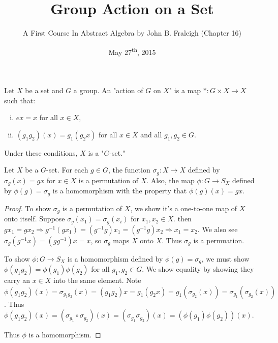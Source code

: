 \documentclass[a4paper,11pt]{article}
\title{Group Action on a Set}
\author{A First Course In Abstract Algebra by John B. Fraleigh (Chapter 16)}
\date{May 27\textsuperscript{th}, 2015}
\begin{document}
\maketitle
{}
\setlength\parindent{24pt}

\begin{outline}

    Let \(X\) be a set and \(G\) a group. An "action of \(G\) on \(X\)" is a map 
    \(*: G \times X \rightarrow X\) such that:
    \begin{enumerate}[i.]
      \item \(ex = x\) for all \(x \in X\),
      \item \((g_{1}g_{2})(x) = g_{1}(g_{2}x)\) for all \(x \in X\) and all \(g_{1}, g_{2} \in G\).
    \end{enumerate}
    Under these conditions, \(X\) is a "\(G\)-set."

    Let \(X\) be a \(G\)-set. For each \(g \in G\), the function \(\sigma_{g}: X \rightarrow X\)
    defined by \(\sigma_{g}(x) = gx\) for \(x \in X\) is a permutation of \(X\). Also, the map 
    \(\phi: G \rightarrow S_{X}\) defined by \(\phi(g) = \sigma_{g}\) is a homomorphism with the 
    property that \(\phi(g)(x) = gx\).
    
    \begin{proof}
      To show \(\sigma_{g}\) is a permutation of \(X\), we show it's a one-to-one map of \(X\) onto itself. Suppose
      \(\sigma_{g}(x_{1}) = \sigma_{g}(x_{i})\) for \(x_{1}, x_{2} \in X\). then \(gx_{1} = gx_{2} \Rightarrow 
      g^{-1}(gx_{1}) = (g^{-1}g)x_{1} = (g^{-1}g)x_{2} \Rightarrow x_{1} = x_{2}\). We also see \(\sigma_{g}(g^{-1}x) =
      (gg^{-1})x = x\), so \(\sigma_{g}\) maps \(X\) onto \(X\). Thus \(\sigma_{g}\) is a permuation.
      
      To show \(\phi: G \rightarrow S_{X}\) is a homomorphism defined by \(\phi(g) = \sigma_{g}\), we must show 
      \(\phi(g_{1}g_{2}) = \phi(g_{1})\phi(g_2)\) for all \(g_1, g_2 \in G\). We show equality by showing they carry an
      \(x \in X\) into the same element. Note \(\phi(g_1g_2)(x) = \sigma_{g_1g_2}(x) = (g_1g_2)x = g_1(g_2x) 
      = g_1(\sigma_{g_2}(x)) = \sigma_{g_1}(\sigma_{g_2}(x))\). Thus \(\phi(g_1g_2)(x) = 
      (\sigma_{g_1} \circ \sigma_{g_2})(x) = (\sigma_{g_1}\sigma_{g_2})(x) = (\phi(g_1)\phi(g_2))(x)\). 
      
      Thus \(\phi\) is a homomorphism.
    \end{proof}


\end{outline}
\end{document}
